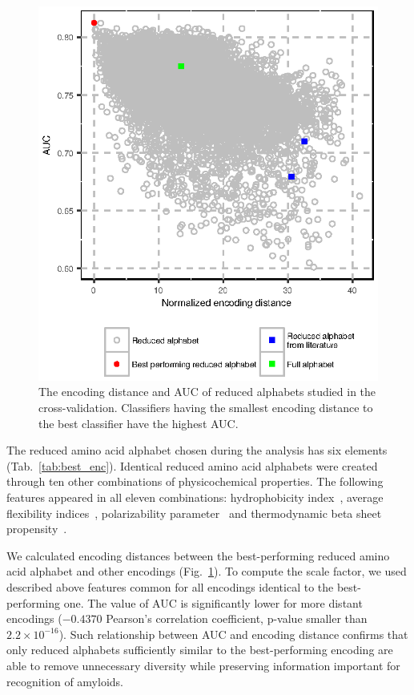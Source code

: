 \documentclass{bioinfo}
\begin{document}
\begin{figure}[!tpb]
\centerline{\includegraphics{figures/ed_AUC.eps}}
\caption{The encoding distance and AUC of reduced alphabets studied in the 
cross-validation. 
Classifiers having the smallest encoding distance to the best classifier have 
the highest AUC.}\label{fig:ed_AUC}
\end{figure}

  The reduced amino acid alphabet chosen during the analysis has six elements 
(Tab.~\ref{tab:best_enc}). Identical reduced amino acid alphabets were created 
through ten other combinations of physicochemical properties. The following 
features appeared in all eleven combinations: hydrophobicity 
index~\citep{argos_structural_1982}, average flexibility 
indices~\citep{bhaskaran_positional_1988}, polarizability 
parameter~\citep{charton_structural_1982} and thermodynamic beta sheet 
propensity~\citep{kim_thermodynamic_1993}.

We calculated encoding distances between the best-performing reduced amino acid 
alphabet and other encodings (Fig.~\ref{fig:ed_AUC}). To compute the scale 
factor, we used described above features common for all encodings identical to 
the best-performing one. The value of AUC is significantly lower for more 
distant encodings ($-0.4370$ Pearson's correlation coefficient, p-value smaller 
than $2.2 \times 10^{-16}$). Such relationship between AUC and encoding distance 
confirms that only reduced alphabets sufficiently similar to the 
best-performing encoding are able to remove unnecessary diversity while 
preserving information important for recognition of amyloids. 
\end{document}
